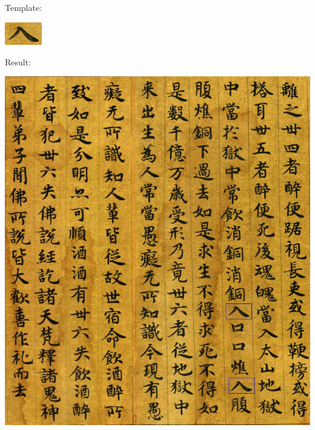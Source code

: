 \documentclass[a4paper,11pt]{article}
\begin{document}
\subsection{}
Template:
\begin{center}
\includegraphics[width=.2\textwidth]{test2}
\end{center}
Result:
\begin{center}
\includegraphics[width=.8\textwidth]{result2}
\end{center}

\clearpage
\end{document}
